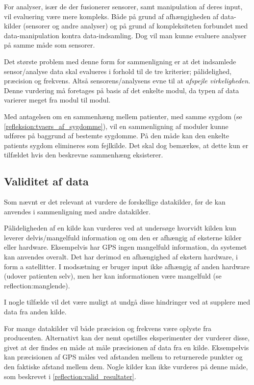 For analyser, især de der fusionerer sensorer, samt manipulation af deres input, vil evaluering være mere kompleks.
Både på grund af afhængigheden af data-kilder (sensorer og andre analyser) og på grund af kompleksiteten forbundet med data-manipulation kontra data-indsamling.
Dog vil man kunne evaluere analyser på samme måde som sensorer.

Det største problem med denne form for sammenligning er at det indsamlede sensor/analyse data skal evalueres i forhold til de tre kriterier; pålidelighed, præcision og frekvens.
Altså sensorens/analysens evne til at \textit{afspejle virkeligheden}.
Denne vurdering må foretages på basis af det enkelte modul, da typen af data varierer meget fra modul til modul.

Med antagelsen om en sammenhæng mellem patienter, med samme sygdom (se \cref{refleksion:tvaers_af_sygdomme}), vil en sammenligning af moduler kunne udføres på baggrund af bestemte sygdomme.
På den måde kan den enkelte patients sygdom elimineres som fejlkilde.
Det skal dog bemærkes, at dette kun er tilfældet hvis den beskrevne sammenhæng eksisterer.

\subsection{Validitet af data}
Som nævnt er det relevant at vurdere de forskellige datakilder, før de kan anvendes i sammenligning med andre datakilder.

Pålideligheden af en kilde kan vurderes ved at undersøge hvorvidt kilden kun leverer delvis/mangelfuld information og om den er afhængig af eksterne kilder eller hardware.
Eksempelvis har GPS ingen mangelfuld information, da systemet kan anvendes overalt.
Det har derimod en afhængighed af ekstern hardware, i form a satellitter.
I modsætning er bruger input ikke afhængig af anden hardware (udover patienten selv), men her kan informationen være mangelfuld (se reflection:manglende).

I nogle tilfælde vil det være muligt at undgå disse hindringer ved at supplere med data fra anden kilde.

For mange datakilder vil både præcision og frekvens være oplyste fra producenten.
Alternativt kan der nemt opstilles eksperimenter der vurderer disse, givet at der findes en måde at måle præcisionen af data fra en kilde.
Eksempelvis kan præcisionen af GPS måles ved afstanden mellem to returnerede punkter og den faktiske afstand mellem dem.
Nogle kilder kan ikke vurderes på denne måde, som beskrevet i \cref{reflection:valid_resultater}.


